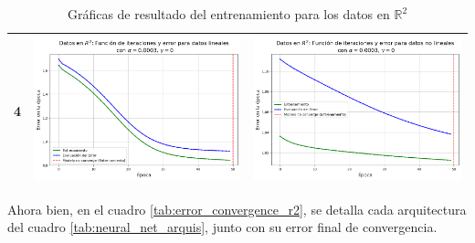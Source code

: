 \documentclass{article}
\begin{document}
\begin{table}[h!]
\begin{tabular}{|c|M{68mm}|M{68mm}|}
        4 & \includegraphics[width=\linewidth]{imgs/R2/Lineal_4.png} & \includegraphics[width=\linewidth]{imgs/R2/Nonlineal_4.png}\\
        \bottomrule
    \end{tabular}
    \caption{Gráficas de resultado del entrenamiento para los datos en $\mathbb{R}^2$}
    \label{tab:r2_summary_table}
\end{table}

Ahora bien, en el cuadro \ref{tab:error_convergence_r2}, se detalla cada arquitectura del cuadro \ref{tab:neural_net_arquis}, junto con su error final de convergencia.
\end{document}

